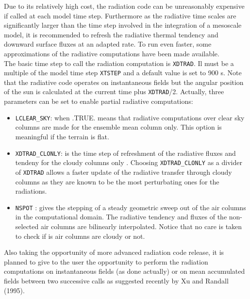 Due to its relatively high cost, the radiation code can be unreasonably
expensive if called at each model time step. Furthermore as the radiative time
scales are significantly larger than the time step involved in the integration
of a mesoscale model, it is recommended to refresh the radiative thermal
tendency and downward surface fluxes at an adapted rate. To run even faster,
some approximations of the radiative computations have been made available.\\

The basic time step to call the radiation computation is {\tt XDTRAD}. Il must
be a multiple of the model time step {\tt XTSTEP} and a default value is set to
900 s. Note that the radiative code operates on instantaneous fields but the
angular position of the sun is calculated at the current time plus
{\tt XDTRAD}/2. Actually, three parameters can be set to enable partial
radiative computations:

\begin{itemize}
\item {\tt LCLEAR\_SKY}: when .TRUE. means that radiative computations over
clear sky columns are made for the ensemble mean column only. This option is
meaningful if the terrain is flat.
\item {\tt XDTRAD\_CLONLY}: is the time step of refreshment of the radiative
fluxes and tendeny for the cloudy columns only\footnotemark
%
. Choosing {\tt XDTRAD\_CLONLY} as a divider of {\tt XDTRAD} allows a faster
update of the radiative transfer through cloudy columns as they are known to be
the most perturbating ones for the radiations.
\item {\tt NSPOT}\footnotemark
%
: gives the stepping of a steady geometric sweep out of the air columns
in the computational domain. The radiative tendency and fluxes of the
non-selected air columns are bilinearly interpolated. Notice that no care is
taken to check if is air columns are cloudy or not.
\end{itemize}

Also taking the opportunity of more advanced radiation code release, it is
planned to give to the user the opportunity to perform the radiation
computations on instantaneous fields (as done actually) or on mean accumulated
fields between two successive calls as suggested recently by Xu and
Randall (1995).

%
